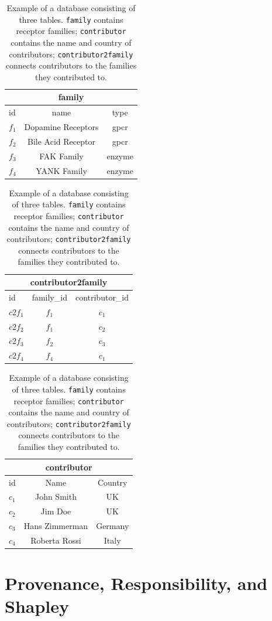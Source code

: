 \documentclass[preprint,12pt,sort&compress]{elsarticle}
\begin{document}
\begin{table}[]
\centering
\begin{tabular}{| l | cc |}
\multicolumn{3}{c}{\textbf{family}}\\
\hline
 id & name & type \\
  \hline
  $f_1$ & Dopamine Receptors & gpcr \\
  $f_2$ & Bile Acid Receptor & gpcr \\
  $f_3$ & FAK Family         & enzyme \\
  $f_4$ & YANK Family        & enzyme \\
\hline
\end{tabular}	
\begin{tabular}{| l |c c|}
\multicolumn{3}{c}{\textbf{contributor2family}}\\
\hline
 id & family\_id & contributor\_id \\
  \hline
  $c2f_1$ & $f_1$ & $c_1$ \\
  $c2f_2$ & $f_1$ & $c_2$ \\
  $c2f_3$ & $f_2$ & $c_3$ \\
  $c2f_4$ & $f_4$ & $c_1$ \\
\hline
\end{tabular}		
\begin{tabular}{| l |c c|}
\multicolumn{3}{c}{\textbf{contributor}}\\
\hline
 id & Name & Country \\
  \hline
  $c_1$ & John Smith & UK \\
  $c_2$ & Jim Doe & UK \\
  $c_3$ & Hans Zimmerman & Germany \\
  $c_4$ & Roberta Rossi & Italy \\
\hline
\end{tabular}		
\caption{Example of a database consisting of three tables. \texttt{family} contains receptor families; \texttt{contributor} contains the name and country of contributors; \texttt{contributor2family} connects contributors to the families they contributed to.}
\label{table:running_example}
\end{table}

\section{Provenance, Responsibility, and Shapley}
\label{section:preliminaries}
\end{document}
